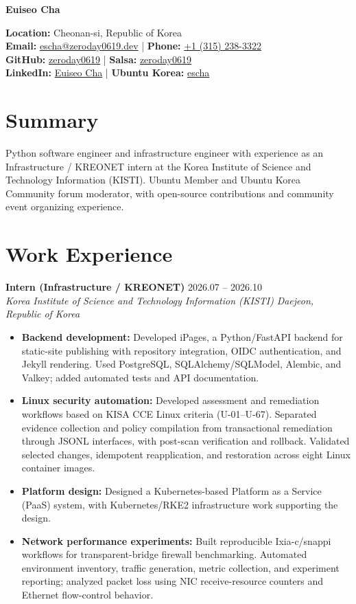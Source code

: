 \documentclass[11pt,a4paper]{article}
\newcommand{\cvname}[1]{\begin{center}\Huge\bfseries #1\end{center}}
\newcommand{\cvcontact}[1]{\begin{center}\small\renewcommand{\baselinestretch}{1.3}\selectfont #1\end{center}}
\newcommand{\cventry}[5]{%
  \textbf{#1} \hfill {\small #4}\\
  \textit{#2} \hfill \textit{\small #3}\\
  \vspace{-4pt}
  \begin{itemize}[topsep=2pt,itemsep=2pt]
    #5
  \end{itemize}
  \vspace{2pt}
}
\begin{document}
\cvname{Euiseo Cha}
\cvcontact{
  \textbf{Location:} Cheonan-si, Republic of Korea\\
  \textbf{Email:} \href{mailto:escha@zeroday0619.dev}{escha@zeroday0619.dev} \;|\;
  \textbf{Phone:} \href{tel:+13152383322}{+1 (315) 238-3322}\\
  \textbf{GitHub:} \href{https://github.com/zeroday0619}{zeroday0619} \;|\;
  \textbf{Salsa:} \href{https://salsa.debian.org/zeroday0619}{zeroday0619}\\
  \textbf{LinkedIn:} \href{https://www.linkedin.com/in/euiseo-cha}{Euiseo Cha} \;|\;
  \textbf{Ubuntu Korea:} \href{https://bio.ubuntu-kr.org/u/escha}{escha}
}

\section*{Summary}
Python software engineer and infrastructure engineer with experience as an Infrastructure / KREONET intern at the Korea Institute of Science and Technology Information (KISTI). Ubuntu Member and Ubuntu Korea Community forum moderator, with open-source contributions and community event organizing experience.

\section*{Work Experience}
\cventry{Intern (Infrastructure / KREONET)}
{Korea Institute of Science and Technology Information (KISTI)}
{Daejeon, Republic of Korea}{2026.07 -- 2026.10}{
  \item \textbf{Backend development:} Developed iPages, a Python/FastAPI backend for static-site publishing with repository integration, OIDC authentication, and Jekyll rendering. Used PostgreSQL, SQLAlchemy/SQLModel, Alembic, and Valkey; added automated tests and API documentation.
  \item \textbf{Linux security automation:} Developed assessment and remediation workflows based on KISA CCE Linux criteria (U-01--U-67). Separated evidence collection and policy compilation from transactional remediation through JSONL interfaces, with post-scan verification and rollback. Validated selected changes, idempotent reapplication, and restoration across eight Linux container images.
  \item \textbf{Platform design:} Designed a Kubernetes-based Platform as a Service (PaaS) system, with Kubernetes/RKE2 infrastructure work supporting the design.
  \item \textbf{Network performance experiments:} Built reproducible Ixia-c/snappi workflows for transparent-bridge firewall benchmarking. Automated environment inventory, traffic generation, metric collection, and experiment reporting; analyzed packet loss using NIC receive-resource counters and Ethernet flow-control behavior.
}
\end{document}

